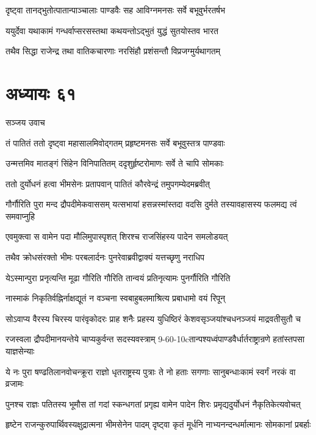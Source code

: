 \twolineshloka
{दृष्ट्वा तानद्भुतोत्पातान्पाञ्चालाः पाण्डवैः सह}
{आविग्नमनसः सर्वे बभूवुर्भरतर्षभ}


\twolineshloka
{ययुर्देवा यथाकामं गन्धर्वाप्सरसस्तथा}
{कथयन्तोऽद्भुतं युद्धं सुतयोस्तव भारत}


\twolineshloka
{तथैव सिद्धा राजेन्द्र तथा वातिकचारणाः}
{नरसिंहौ प्रशंसन्तौ विप्रजग्मुर्यथागतम्}


\chapter{अध्यायः ६१}
\twolineshloka
{सञ्जय उवाच}
{}


\twolineshloka
{तं पातितं ततो दृष्ट्वा महासालमिवोद्गतम्}
{प्रहृष्टमनसः सर्वे बभूवुस्तत्र पाण्डवाः}


\twolineshloka
{उन्मत्तमिव मातङ्गं सिंहेन विनिपातितम्}
{ददृशुर्हृष्टरोमाणः सर्वे ते चापि सोमकाः}


\twolineshloka
{ततो दुर्योधनं हत्वा भीमसेनः प्रतापवान्}
{पातितं कौरवेन्द्रं तमुपगम्येदमब्रवीत्}


\threelineshloka
{गौर्गौरिति पुरा मन्द द्रौपदीमेकवाससम्}
{यत्सभायां हसन्नस्मांस्तदा वदसि दुर्मते}
{तस्यावहासस्य फलमद्य त्वं समवाप्नुहि}


\twolineshloka
{एवमुक्त्वा स वामेन पदा मौलिमुपास्पृशत्}
{शिरश्च राजसिंहस्य पादेन समलोडयत्}


\twolineshloka
{तथैव क्रोधसंरक्तो भीमः परबलार्दनः}
{पुनरेवाब्रवीद्वाक्यं यत्तच्छृणु नराधिप}


\twolineshloka
{येऽस्मान्पुरा प्रनृत्यन्ति मूढा गौरिति गौरिति}
{तान्वयं प्रतिनृत्यामः पुनर्गौरिति गौरिति}


\twolineshloka
{नास्माकं निकृतिर्वह्निर्नाक्षद्यूतं न वञ्चना}
{स्वबाहुबलमाश्रित्य प्रबाधामो वयं रिपून्}


\twolineshloka
{सोऽवाप्य वैरस्य चिरस्य पारंवृकोदरः प्राह शनैः प्रहस्य}
{युधिष्ठिरं केशवसृञ्जयांश्चधनञ्जयं माद्रवतीसुतौ च}


\twolineshloka
{रजस्वला द्रौपदीमानयन्तेये चाप्यकुर्वन्त सदस्यवस्त्राम्}
{9-60-10cतान्पश्यध्वंपाण्डवैर्धार्तराष्ट्रान्रणे हतांस्तपसा याज्ञसेन्याः}


\twolineshloka
{ये नः पुरा षण्ढतिलानवोचन्क्रूरा राज्ञो धृतराष्ट्रस्य पुत्राः}
{ते नो हताः सगणाः सानुबन्धाःकामं स्वर्गं नरकं वा व्रजामः}


\twolineshloka
{पुनश्च राज्ञः पतितस्य भूमौस तां गदां स्कन्धगतां प्रगृह्य}
{वामेन पादेन शिरः प्रमृद्यदुर्योधनं नैकृतिकेत्यवोचत्}


\twolineshloka
{हृष्टेन राजन्कुरुपार्थिवस्यक्षुद्रात्मना भीमसेनेन पादम्}
{दृष्ट्वा कृतं मूर्धनि नाभ्यनन्दन्धर्मात्मानः सोमकानां प्रबर्हाः}


